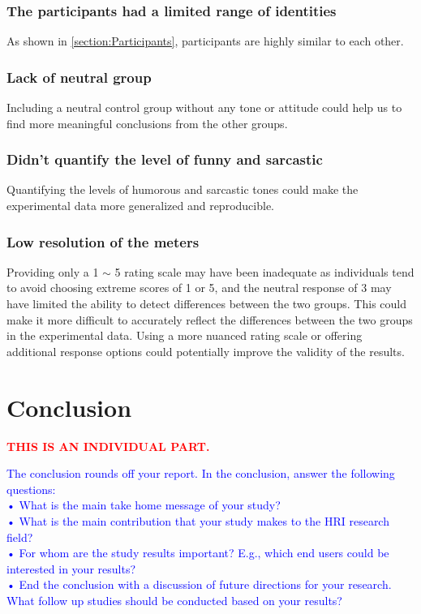 \documentclass[conference]{IEEEtran}
\begin{document}
\subsubsection{The participants had a limited range of identities} As shown in \ref{section:Participants}, participants are highly similar to each other.
\subsubsection{Lack of neutral group} Including a neutral control group without any tone or attitude could help us to find more meaningful conclusions from the other groups.
\subsubsection{Didn't quantify the level of funny and sarcastic}
 Quantifying the levels of humorous and sarcastic tones could make the experimental data more generalized and reproducible.
\subsubsection{Low resolution of the meters} Providing only a 1 $\sim$ 5 rating scale may have been inadequate as individuals tend to avoid choosing extreme scores of 1 or 5, and the neutral response of 3 may have limited the ability to detect differences between the two groups. This could make it more difficult to accurately reflect the differences between the two groups in the experimental data. Using a more nuanced rating scale or offering additional response options could potentially improve the validity of the results.

\section{Conclusion}

    
\textcolor{red}{\textbf{THIS IS AN INDIVIDUAL PART.}}

\textcolor{blue}{The conclusion rounds off your report. In the conclusion, answer the following questions:\\
• What is the main take home message of your study?\\
• What is the main contribution that your study makes to the HRI research field?\\
• For whom are the study results important? E.g., which end users could be interested 
in your results?\\
• End the conclusion with a discussion of future directions for your research. What follow 
up studies should be conducted based on your results?}
\end{document}

